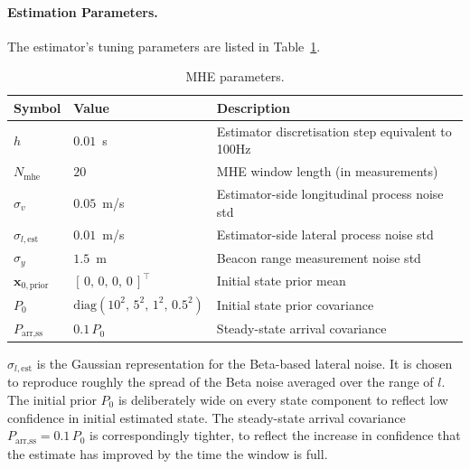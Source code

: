 \paragraph{Estimation Parameters.}
The estimator's tuning parameters are listed in Table~\ref{tab:est_params}.

\begin{table}[H]
    \centering
    \begin{tabular}{l|l|l}
        Symbol & Value & Description \\ \hline
        $h$                             & $0.01$~s                                          & Estimator discretisation step equivalent to 100Hz \\
        $N_{\text{mhe}}$                & $20$                                              & MHE window length (in measurements) \\
        $\sigma_{v}$                    & $0.05$~m/s                                        & Estimator-side longitudinal process noise std \\
        $\sigma_{l,\text{est}}$         & $0.01$~m/s                                        & Estimator-side lateral process noise std \\
        $\sigma_{y}$                    & $1.5$~m                                           & Beacon range measurement noise std \\
        $\mathbf{x}_{0,\text{prior}}$   & $[\,0,\,0,\,0,\,0\,]^{\top}$                      & Initial state prior mean \\
        $P_{0}$                         & $\mathrm{diag}(10^{2},\,5^{2},\,1^{2},\,0.5^{2})$ & Initial state prior covariance \\
        $P_{\text{arr,ss}}$             & $0.1\,P_{0}$                                      & Steady-state arrival covariance \\
    \end{tabular}
    \caption{MHE parameters.}
    \label{tab:est_params}
\end{table}

$\sigma_{l,\text{est}}$ is the Gaussian representation for the Beta-based lateral noise. It is chosen to reproduce roughly the spread of the Beta noise averaged over the range of $l$. The initial prior $P_{0}$ is deliberately wide on every state component to reflect low confidence in initial estimated state. The steady-state arrival covariance $P_{\text{arr,ss}} = 0.1\,P_{0}$ is correspondingly tighter, to reflect the increase in confidence that the estimate has improved by the time the window is full.


